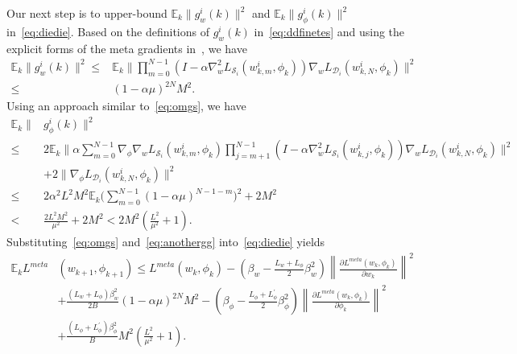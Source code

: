 \documentclass{osudissert96}
\begin{document}
 Our next
step is to upper-bound $\mathbb{E}_k\big\|g_{w}^i(k) \big\|^2$ and $\mathbb{E}_k\big\|g_{\phi}^i(k) \big\|^2$ in~\cref{eq:diedie}. Based on the definitions of $g_{w}^i(k)$ in~\cref{eq:ddfinetes} and using the explicit forms of the meta gradients in~, we have
\begin{align}\label{eq:omgs}
\mathbb{E}_k\big\|g_{w}^i(k) \big\|^2 \leq& \mathbb{E}_k\Big\|\prod_{m=0}^{N-1}(I - \alpha \nabla_w^2L_{\mathcal{S}_i}(w_{k,m}^i,\phi_k)) \nabla_{w} L_{\mathcal{D}_i} (w_{k,N}^i,\phi_k)\Big\|^2 \nonumber\\\leq &(1-\alpha\mu)^{2N} M^2.
\end{align}
Using an approach similar to~\cref{eq:omgs}, we have 
\begin{align}\label{eq:anothergg}
\mathbb{E}_k\big\|&g_{\phi}^i(k) \big\|^2  \nonumber
\\ \leq& 2\mathbb{E}_k\bigg\|\alpha \sum_{m=0}^{N-1}\nabla_\phi\nabla_w L_{\mathcal{S}_i}(w_{k,m}^i,\phi_k) \prod_{j=m+1}^{N-1}(I-\alpha\nabla_w^2L_{\mathcal{S}_i}(w_{k,j}^i,\phi_k))\nabla_w L_{\mathcal{D}_i}(w_{k,N}^i,\phi_k)\bigg\|^2 \nonumber
\\&+2\|\nabla_\phi L_{\mathcal{D}_i}(w_{k,N}^i,\phi_k)\|^2 \nonumber
\\ \leq& 2\alpha^2 L^2 M^2 \mathbb{E}_k\Big(\sum_{m=0}^{N-1} (1-\alpha \mu)^{N-1-m}\Big)^2 +2 M^2 \nonumber
\\< & \frac{2L^2M^2}{\mu^2}+2M^2 <  2M^2 \left( \frac{L^2}{\mu^2}+1 \right).
\end{align}
Substituting~\cref{eq:omgs} and~\cref{eq:anothergg} into~\cref{eq:diedie} yields
\begin{align}\label{eq:jingyi}
\mathbb{E}_k L^{meta}&(w_{k+1},\phi_{k+1}) \leq L^{meta}(w_k,\phi_k) - \left(\beta_w-\frac{L_w+L_\phi}{2}\beta_w^2\right)\left\| \frac{\partial L^{meta}(w_k,\phi_k)}{\partial w_k}\right\|^2 \nonumber
\\&+ \frac{(L_w+L_\phi)\beta_w^2}{2B}(1-\alpha\mu)^{2N} M^2-\left(\beta_\phi -\frac{L_\phi+L_\phi^\prime}{2}\beta_\phi^2 \right)\left\| \frac{\partial L^{meta}(w_{k},\phi_k)}{\partial \phi_k}  \right\|^2\nonumber
\\ & + \frac{ (L_\phi+L_\phi^\prime) \beta_\phi^2}{B} M^2 \left( \frac{L^2}{\mu^2}+1 \right).
\end{align}
\end{document}

